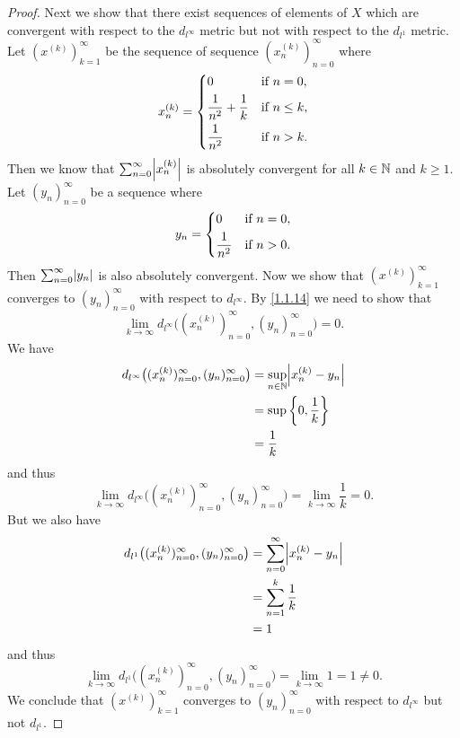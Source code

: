 \begin{proof}
  Next we show that there exist sequences of elements of \(X\) which are convergent with respect to the \(d_{l^\infty}\) metric but not with respect to the \(d_{l^1}\) metric.
  Let \((x^{(k)})_{k = 1}^\infty\) be the sequence of sequence \((x_n^{(k)})_{n = 0}^\infty\) where
  \[
    x_n^{(k)} = \begin{dcases}
      0                             & \text{if } n = 0,    \\
      \dfrac{1}{n^2} + \dfrac{1}{k} & \text{if } n \leq k, \\
      \dfrac{1}{n^2}                & \text{if } n > k.
    \end{dcases}
  \]
  Then we know that \(\sum_{n = 0}^\infty \abs{x_n^{(k)}}\) is absolutely convergent for all \(k \in \mathbb{N}\) and \(k \geq 1\).
  Let \((y_n)_{n = 0}^\infty\) be a sequence where
  \[
    y_n = \begin{dcases}
      0              & \text{if } n = 0, \\
      \dfrac{1}{n^2} & \text{if } n > 0.
    \end{dcases}
  \]
  Then \(\sum_{n = 0}^\infty \abs{y_n}\) is also absolutely convergent.
  Now we show that \((x^{(k)})_{k = 1}^\infty\) converges to \((y_n)_{n = 0}^\infty\) with respect to \(d_{l^\infty}\).
  By \cref{1.1.14} we need to show that
  \[
    \lim_{k \to \infty} d_{l^\infty}\big((x_n^{(k)})_{n = 0}^\infty, (y_n)_{n = 0}^\infty\big) = 0.
  \]
  We have
  \begin{align*}
    d_{l^\infty}\big((x_n^{(k)})_{n = 0}^\infty, (y_n)_{n = 0}^\infty\big) & = \sup_{n \in \N} \abs{x_n^{(k)} - y_n} \\
                                                                           & = \sup \bigg\{0, \dfrac{1}{k}\bigg\}    \\
                                                                           & = \dfrac{1}{k}
  \end{align*}
  and thus
  \[
    \lim_{k \to \infty} d_{l^\infty}\big((x_n^{(k)})_{n = 0}^\infty, (y_n)_{n = 0}^\infty\big) = \lim_{k \to \infty} \dfrac{1}{k} = 0.
  \]
  But we also have
  \begin{align*}
    d_{l^1}\big((x_n^{(k)})_{n = 0}^\infty, (y_n)_{n = 0}^\infty\big) & = \sum_{n = 0}^\infty \abs{x_n^{(k)} - y_n} \\
                                                                      & = \sum_{n = 1}^k \dfrac{1}{k}               \\
                                                                      & = 1
  \end{align*}
  and thus
  \[
    \lim_{k \to \infty} d_{l^1}\big((x_n^{(k)})_{n = 0}^\infty, (y_n)_{n = 0}^\infty\big) = \lim_{k \to \infty} 1 = 1 \neq 0.
  \]
  We conclude that \((x^{(k)})_{k = 1}^\infty\) converges to \((y_n)_{n = 0}^\infty\) with respect to \(d_{l^\infty}\) but not \(d_{l^1}\).


\end{proof}
